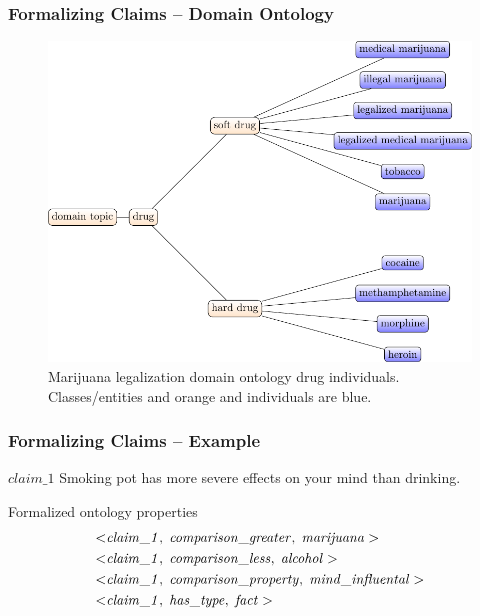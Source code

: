 \documentclass{beamer}
\begin{document}
\begin{frame}
	\frametitle{Formalizing Claims -- Domain Ontology}

\begin{figure}
	\centering
	\includegraphics[scale=0.5]{../formalizations_drug_hierarchy-figure0.pdf}
\caption{Marijuana legalization domain ontology drug individuals. 
	Classes/entities and orange and individuals are blue. }
\end{figure}
\end{frame}

\begin{frame}
	\frametitle{Formalizing Claims -- Example}

	\begin{block}{$\mathit{claim\_1}$}
Smoking pot has more severe effects on your mind than drinking.
\end{block}

Formalized ontology properties
\begin{align*}
	< & \mathit{claim\_1}, \hspace{0.1cm} \mathit{comparison\_greater}, \hspace{0.1cm}
	\mathit{marijuana} > \\
	< & \mathit{claim\_1}, \hspace{0.1cm} \mathit{comparison\_less}, \hspace{0.1cm}
	\mathit{alcohol} >  \\
	< & \mathit{claim\_1}, \hspace{0.1cm} \mathit{comparison\_property}, \hspace{0.1cm}
	\mathit{mind\_influental} >  \\
	< & \mathit{claim\_1}, \hspace{0.1cm} \mathit{has\_type}, \hspace{0.1cm}
	\mathit{fact} > 
\end{align*}
\end{frame}
\end{document}
